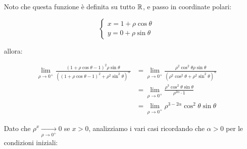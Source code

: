 Noto che questa funzione è definita su tutto \(\mathbb{R} \), e passo in coordinate polari:

\begin{equation*}
    \begin{cases}
        x = 1+\rho\cos\theta \\
        y = 0+\rho\sin\theta
    \end{cases}
\end{equation*}

allora:

\begin{align*}
    \lim_{ \rho \to 0^{+} } \frac{{(1 + \rho\cos\theta  -1 )}^{2} \rho\sin\theta }{{\left({(1+\rho\cos\theta  -1)}^{2}+\rho^{2}\sin^{2}\theta \right)}^{\alpha}} & = \lim_{ \rho \to 0^{+} } \frac{\rho^{2}\cos^{2}\theta \rho\sin\theta }{{\left(\rho^{2}\cos^{2}\theta +\rho^{2}\sin^{2}\theta \right)}^{\alpha}} \\
                                                                                                                                                                 & = \lim_{ \rho \to 0^{+} } \frac{\rho^{3}\cos^{2}\theta \sin\theta }{\rho^{2\alpha} \cdot 1}                                                      \\
                                                                                                                                                                 & = \lim_{ \rho \to 0^{+} } \rho^{3-2\alpha} \cos^{2}\theta \sin\theta
\end{align*}

Dato che \(\rho^x \xrightarrow[\rho \to 0^+]{} 0\) se \(x > 0\), analizziamo i vari casi ricordando che \(\alpha > 0\) per le condizioni iniziali:

